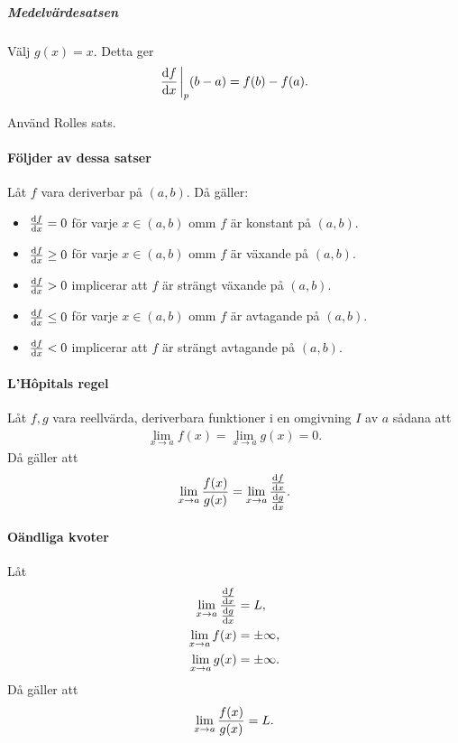 \subparagraph{Medelvärdesatsen}
Välj $g(x) = x$. Detta ger
\begin{align*}
	\dv{f}{x}\eval_p(b - a) = f(b) - f(a).
\end{align*}

\proof
Använd Rolles sats.

\paragraph{Följder av dessa satser}
Låt $f$ vara deriverbar på $(a, b)$. Då gäller:
\begin{itemize}
	\item $\dv{f}{x}(x) = 0$ för varje $x\in (a, b)$ omm $f$ är konstant på $(a, b)$.
	\item $\dv{f}{x}(x)\geq 0$ för varje $x\in (a, b)$ omm $f$ är växande på $(a, b)$.
	\item $\dv{f}{x}(x) > 0$ implicerar att $f$ är strängt växande på $(a, b)$.
	\item $\dv{f}{x}(x)\leq 0$ för varje $x\in (a, b)$ omm $f$ är avtagande på $(a, b)$.
	\item $\dv{f}{x}(x) < 0$ implicerar att $f$ är strängt avtagande på $(a, b)$.
\end{itemize}

\proof

\paragraph{L'Hôpitals regel}
Låt $f, g$ vara reellvärda, deriverbara funktioner i en omgivning $I$ av $a$ sådana att
\begin{align*}
	\lim\limits_{x\to a}f(x) = \lim\limits_{x\to a}g(x) = 0.
\end{align*}
Då gäller att
\begin{align*}
	\lim\limits_{x\to a}\frac{f(x)}{g(x)} = \lim\limits_{x\to a}\frac{\dv{f}{x} (x)}{\dv{g}{x} (x)}.
\end{align*}

\proof

\paragraph{Oändliga kvoter}
Låt
\begin{align*}
	\lim\limits_{x\to a}\frac{\dv{f}{x} (x)}{\dv{g}{x} (x)} &= L, \\
	\lim\limits_{x\to a}f(x)                                        &= \pm\infty, \\
	\lim\limits_{x\to a}g(x)                                        &= \pm\infty.
\end{align*}
Då gäller att
\begin{align*}
	\lim\limits_{x\to a}\frac{f(x)}{g(x)} = L.
\end{align*}

